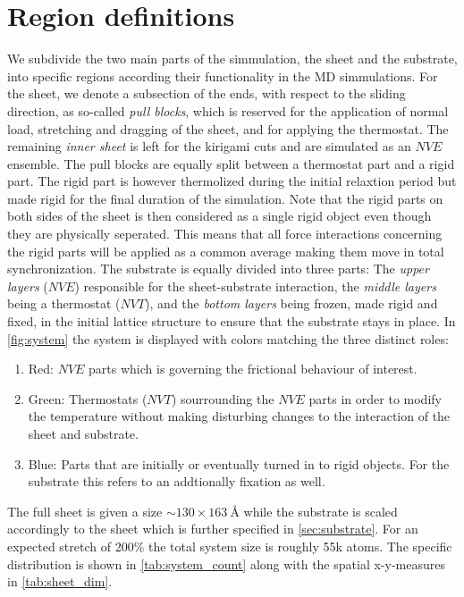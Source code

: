 \section{Region definitions}
We subdivide the two main parts of the simmulation, the sheet and the substrate, into specific regions according their functionality in the \acrshort{MD} simmulations. For the sheet, we denote a subsection of the ends, with respect to the sliding direction, as so-called \textit{pull blocks}, which is reserved for the application of normal load, stretching and
dragging of the sheet, and for applying the thermostat. The remaining \textit{inner
sheet} is left for the kirigami cuts and are simulated as an $NVE$ ensemble. The pull blocks are equally split between a thermostat part and a rigid part. The rigid part is however thermolized during the initial relaxtion period but made rigid for the final duration of the simulation. Note that the rigid parts on both sides of the sheet is then considered as a single rigid object even though
they are physically seperated. This means that all force interactions concerning the rigid parts will be applied as a common average making them move in total synchronization. The substrate is equally divided into three parts: The
\textit{upper layers} ($NVE$) responsible for the sheet-substrate interaction, the
\textit{middle layers} being a thermostat ($NVT$), and the \textit{bottom layers} being frozen, made rigid and fixed, in the initial lattice structure to ensure that the substrate stays in place. In \cref{fig:system} the system is displayed
with colors matching the three distinct roles:
\begin{enumerate}
  \item Red: $NVE$ parts which is governing the frictional behaviour of interest.
  \item Green: Thermostats ($NVT$) sourrounding the $NVE$ parts in order to modify the temperature without making disturbing changes to the interaction of the sheet and substrate.
  \item Blue: Parts that are initially or eventually turned in to rigid objects. For the substrate this refers to an addtionally fixation as well.
\end{enumerate}
The full sheet is given a size $\sim 130 \times \SI{163}{\text{Å}}$ while the substrate is scaled accordingly to the sheet which is further specified in \cref{sec:substrate}. For an expected stretch of 200\% the total system size is roughly 55k atoms. The specific distribution is shown in \cref{tab:system_count} along with the spatial x-y-measures in \cref{tab:sheet_dim}.


